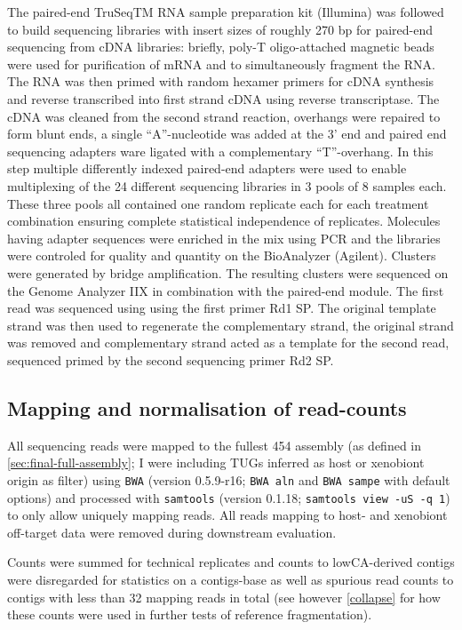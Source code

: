 The paired-end TruSeqTM RNA sample preparation kit (Illumina) was
followed to build sequencing libraries with insert sizes of roughly
270 bp for paired-end sequencing from cDNA libraries: briefly, poly-T
oligo-attached magnetic beads were used for purification of mRNA and
to simultaneously fragment the RNA. The RNA was then primed with
random hexamer primers for cDNA synthesis and reverse transcribed into
first strand cDNA using reverse transcriptase. The cDNA was cleaned
from the second strand reaction, overhangs were repaired to form blunt
ends, a single ``A''-nucleotide was added at the 3' end and paired end
sequencing adapters ware ligated with a complementary
``T''-overhang. In this step multiple differently indexed paired-end
adapters were used to enable multiplexing of the 24 different
sequencing libraries in 3 pools of 8 samples each. These three pools
all contained one random replicate each for each treatment combination
ensuring complete statistical independence of replicates. Molecules
having adapter sequences were enriched in the mix using PCR and the
libraries were controled for quality and quantity on the BioAnalyzer
(Agilent). Clusters were generated by bridge amplification. The
resulting clusters were sequenced on the Genome Analyzer IIX in
combination with the paired-end module. The first read was sequenced
using using the first primer Rd1 SP. The original template strand was
then used to regenerate the complementary strand, the original strand
was removed and complementary strand acted as a template for the
second read, sequenced primed by the second sequencing primer Rd2 SP.

\subsection{Mapping and normalisation of read-counts}

All sequencing reads were mapped to the fullest 454 assembly (as
defined in \ref{sec:final-full-assembly}; I were including TUGs
inferred as host or xenobiont origin as filter) using \texttt{BWA}
\cite{pmid20080505} (version 0.5.9-r16; \texttt{BWA aln} and
\texttt{BWA sampe} with default options) and processed with
\texttt{samtools} \cite{journals/bioinformatics/LiHWFRHMAD09} (version
0.1.18; \texttt{samtools view -uS -q 1}) to only allow uniquely
mapping reads. All reads mapping to host- and xenobiont off-target
data were removed during downstream evaluation.

Counts were summed for technical replicates and counts to
lowCA-derived contigs were disregarded for statistics on a
contigs-base as well as spurious read counts to contigs with less
than 32 mapping reads in total (see however \ref{collapse} for how
these counts were used in further tests of reference fragmentation).

